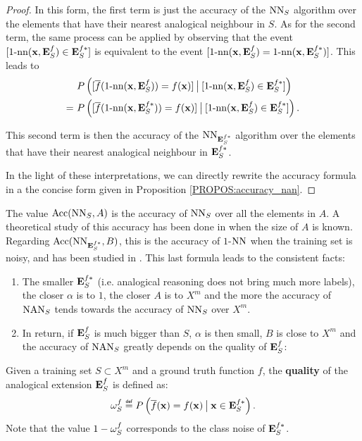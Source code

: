\begin{proof}
In this form, the first term is just the accuracy of the $\NN_S$ algorithm over
the elements that have their nearest analogical neighbour in $S$.
As for the second term, the same process can be applied by observing that the
event $[\nn(\mathbf{x}, \esf) \in\esfs]$ is equivalent to the event
$[\nn(\mathbf{x}, \esf) = \nn(\mathbf{x}, \esfs)]$. This leads to
\begin{align*}
  &P\left([\albl{\nn(\mathbf{x}, \esf)} = f(\mathbf{x})] \given[\big]
  [\nn(\mathbf{x}, \esf) \in \esfs]\right)\\
  =~ &P\left([\albl{\nn(\mathbf{x}, \esfs)} = f(\mathbf{x})] \given[\big]
  [\nn(\mathbf{x}, \esf) \in \esfs]\right).
\end{align*}

This second term is then the accuracy of the $\NN_{\esfs}$ algorithm over the
elements that have their nearest analogical neighbour in $\esfs$.

In the light of these interpretations, we can directly rewrite the accuracy
formula in a the concise form given in Proposition \ref{PROPOS:accuracy_nan}.
\end{proof}

The value $\acc(\NN_S, A)$ is the accuracy of $\NN_S$ over all the elements in
$A$. A theoretical study of this accuracy has been done in \cite{LanIbaIJCAI93}
when the size of $A$ is known.  Regarding $\acc(\NN_{\esfs}, B)$, this is the
accuracy of $1$-$\NN$ when the training set is
noisy, and has been studied in \cite{OkaYugIJCAI97}. This last formula leads
to the consistent facts:
\begin{enumerate}
\item The smaller $\esfs$ (i.e. analogical reasoning does not
  bring much more labels), the closer $\alpha$ is to $1$, the closer $A$ is to
  $X^m$ and the more the accuracy of $\NAN_S$ tends towards the accuracy of
  $\NN_S$ over $X^m$.
\item In return, if $\esf$ is much bigger than $S$, $\alpha$ is then small, $B$
  is close to $X^m$ and the accuracy of $\NAN_S$ greatly depends on the quality
  of $\esf$:  \end{enumerate}

\begin{definition}
  \label{DEF:omega}
  Given a training set $S\subset X^m$ and a ground truth function $f$, the
  \textbf{quality} of the analogical extension $\esf$ is defined as:
  $$
  \omegasf \eqdef P\left(\albl{\mathbf{x}} = f(\mathbf{x}) \given[\big]
  \mathbf{x} \in \esfs\right).$$
  Note that the value $1 - \omegasf$ corresponds to the class noise of $\esfs$.
\end{definition}

